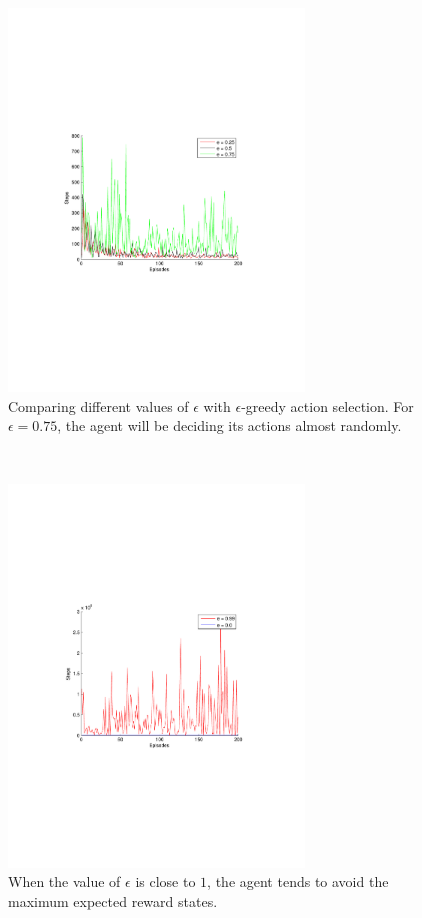 \documentclass[a4paper,11pt]{article}
\begin{document}
\begin{figure}[t!]
  \centering
    \includegraphics[trim=4cm 8.5cm 4cm 8.5cm,clip,width=0.7\textwidth]{figures/egreedycomp.pdf}
    \caption{Comparing different values of $\epsilon$ with $\epsilon$-greedy action selection. For $\epsilon = 0.75$, the agent will be deciding its actions almost randomly.}
    \label{egreedycomp}
\end{figure}
~
\begin{figure}[h!]
  \centering
    \includegraphics[trim=4cm 8.5cm 4cm 8.5cm,clip,width=0.7\textwidth]{figures/egreedyextreme.pdf}
    \caption{When the value of $\epsilon$ is close to $1$, the agent tends to avoid the maximum expected reward states.}
    \label{egreedyextreme}
\end{figure}
\end{document}
